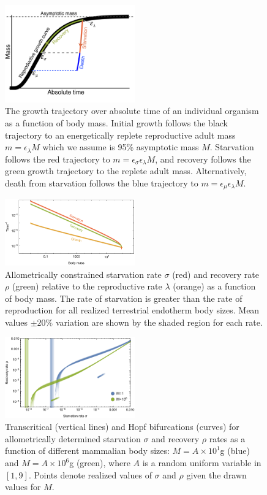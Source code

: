 \documentclass{pnastwo}
\begin{document}
\begin{figure}
\centering
\includegraphics[width=0.5\textwidth]{Growth-trajectory-diagram.pdf}
\caption{ The growth trajectory over absolute time of an individual organism
  as a function of body mass.  Initial growth follows the black trajectory to
  an energetically replete reproductive adult mass $m=\epsilon_\lambda M$ which we assume is 95\% asymptotic mass $M$.  Starvation follows the red
  trajectory to $m = \epsilon_\sigma \epsilon_\lambda  M$, and recovery follows the
  green growth trajectory to the replete adult mass. Alternatively, death from starvation follows the blue trajectory to $m=\epsilon_\mu \epsilon_\lambda  M$.}
\label{fig:growth}
\end{figure}

\begin{figure}
\centering
\includegraphics[width=0.5\textwidth]{fig_Rates.pdf}
\caption{
Allometrically constrained starvation rate $\sigma$ (red) and recovery rate $\rho$ (green) relative to the reproductive rate $\lambda$ (orange) as a function of body mass.
The rate of starvation is greater than the rate of reproduction for all realized terrestrial endotherm body sizes.
Mean values $\pm 20\%$ variation are shown by the shaded region for each rate.
}
\label{fig:gvs}
\end{figure}


\begin{figure}
\centering
\includegraphics[width=0.5\textwidth]{fig_DataHopf.pdf}
\caption{ Transcritical (vertical lines) and Hopf bifurcations (curves) for
  allometrically determined starvation $\sigma$ and recovery $\rho$ rates as
  a function of different mammalian body sizes: $M=A\times10^1$g (blue) and
  $M=A\times10^6$g (green), where $A$ is a random uniform variable in $[1,9]$.
  Points denote realized values of $\sigma$ and $\rho$ given the drawn values for $M$.
  }
\label{fig:hopf}
\end{figure}
\end{document}
